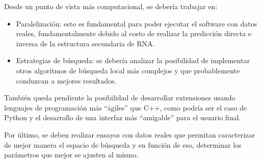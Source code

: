Desde un punto de vista m\'as computacional, se deber\'ia trabajar en:
\begin{itemize}
 \item Paralelizaci\'on: esto es fundamental para poder ejecutar el
software con datos reales, fundamentalmente debido al costo de realizar la
predicci\'on directa e inversa de la estructura secundaria de \ac{RNA}.
 \item Estrategias de b\'usqueda: se deber\'ia analizar la posibilidad de
implementar otros algoritmos de b\'usqueda local m\'as complejos y que
probablemente conduzcan a mejores resultados.
\end{itemize}

Tambi\'en queda pendiente la posibilidad de desarrollar extensiones usando
lenguajes de programaci\'on m\'as ``\'agiles'' que C++, como podr\'ia ser el
caso de Python y el desarrollo de una interfaz m\'as ``amigable'' para el
usuario final. 

Por \'ultimo, se deben realizar ensayos con datos reales que permitan
caracterizar de mejor manera el espacio de b\'usqueda y en funci\'on de eso,
determinar los par\'ametros que mejor se ajusten al mismo.
